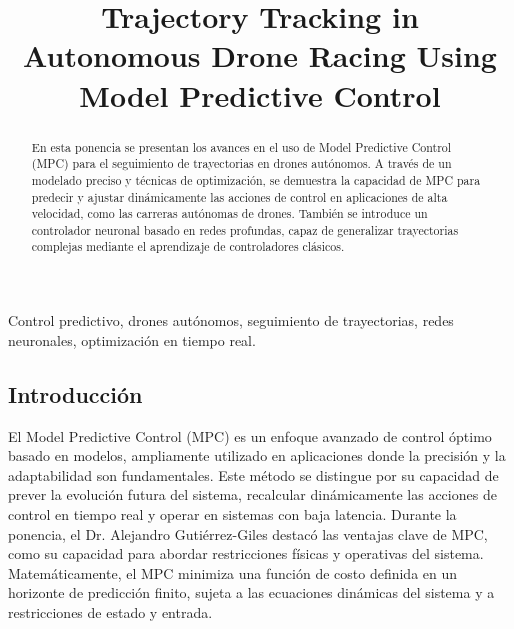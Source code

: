 \documentclass[conference]{IEEEtran}
\begin{document}
\title{Trajectory Tracking in Autonomous Drone Racing Using Model Predictive Control
}

\author{
	\and
}

\maketitle

\begin{abstract}
    En esta ponencia se presentan los avances en el uso de Model Predictive Control (MPC) para el seguimiento de trayectorias en drones autónomos. A través de un modelado preciso y técnicas de optimización, se demuestra la capacidad de MPC para predecir y ajustar dinámicamente las acciones de control en aplicaciones de alta velocidad, como las carreras autónomas de drones. También se introduce un controlador neuronal basado en redes profundas, capaz de generalizar trayectorias complejas mediante el aprendizaje de controladores clásicos.
\end{abstract}

\begin{IEEEkeywords}
    Control predictivo, drones autónomos, seguimiento de trayectorias, redes neuronales, optimización en tiempo real.
\end{IEEEkeywords}

\subsection*{Introducción}

El Model Predictive Control (MPC) es un enfoque avanzado de control óptimo basado en modelos, ampliamente utilizado en aplicaciones donde la precisión y la adaptabilidad son fundamentales. Este método se distingue por su capacidad de prever la evolución futura del sistema, recalcular dinámicamente las acciones de control en tiempo real y operar en sistemas con baja latencia. Durante la ponencia, el Dr. Alejandro Gutiérrez-Giles destacó las ventajas clave de MPC, como su capacidad para abordar restricciones físicas y operativas del sistema. Matemáticamente, el MPC minimiza una función de costo definida en un horizonte de predicción finito, sujeta a las ecuaciones dinámicas del sistema y a restricciones de estado y entrada.
\end{document}
